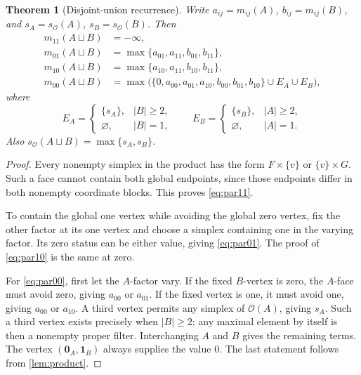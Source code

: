 \documentclass[11pt]{article}
\newtheorem{theorem}{Theorem}[section]
\theoremstyle{definition}
\newcommand{\OO}{\mathcal O}
\newcommand{\sO}{s_{\OO}}
\newcommand{\one}{\mathbf 1}
\newcommand{\zero}{\mathbf 0}
\begin{document}
\begin{theorem}[Disjoint-union recurrence]\label{thm:orderparallel}
Write $a_{ij}=m_{ij}(A)$, $b_{ij}=m_{ij}(B)$, and $s_A=\sO(A)$, $s_B=\sO(B)$. Then
\begin{align}
m_{11}(A\sqcup B)&=-\infty,\label{eq:par11}\\
m_{01}(A\sqcup B)&=\max\{a_{01},a_{11},b_{01},b_{11}\},\label{eq:par01}\\
m_{10}(A\sqcup B)&=\max\{a_{10},a_{11},b_{10},b_{11}\},\label{eq:par10}\\
m_{00}(A\sqcup B)&=\max\bigl(\{0,a_{00},a_{01},a_{10},b_{00},b_{01},b_{10}\}
                    \cup E_A\cup E_B\bigr),\label{eq:par00}
\end{align}
where
\[
E_A=\begin{cases}\{s_A\},&|B|\ge2,\\\varnothing,&|B|=1,\end{cases}
\qquad
E_B=\begin{cases}\{s_B\},&|A|\ge2,\\\varnothing,&|A|=1.\end{cases}
\]
Also $\sO(A\sqcup B)=\max\{s_A,s_B\}$.
\end{theorem}
\begin{proof}
Every nonempty simplex in the product has the form $F\times\{v\}$ or $\{v\}\times G$. Such a face cannot contain both global endpoints, since those endpoints differ in both nonempty coordinate blocks. This proves \eqref{eq:par11}.

To contain the global one vertex while avoiding the global zero vertex, fix the other factor at its one vertex and choose a simplex containing one in the varying factor. Its zero status can be either value, giving \eqref{eq:par01}. The proof of \eqref{eq:par10} is the same at zero.

For \eqref{eq:par00}, first let the $A$-factor vary. If the fixed $B$-vertex is zero, the $A$-face must avoid zero, giving $a_{00}$ or $a_{01}$. If the fixed vertex is one, it must avoid one, giving $a_{00}$ or $a_{10}$. A third vertex permits any simplex of $\OO(A)$, giving $s_A$. Such a third vertex exists precisely when $|B|\ge2$: any maximal element by itself is then a nonempty proper filter. Interchanging $A$ and $B$ gives the remaining terms. The vertex $(\zero_A,\one_B)$ always supplies the value $0$. The last statement follows from \cref{lem:product}.
\end{proof}
\end{document}
